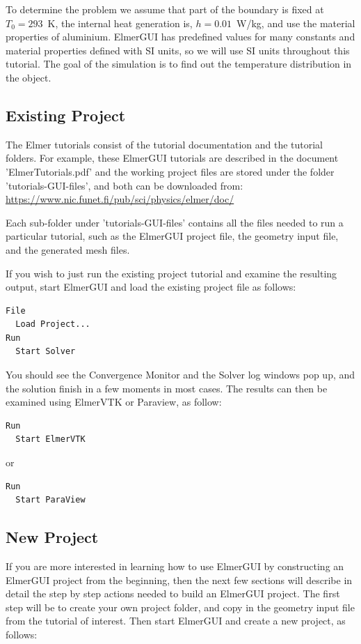 To determine the problem we assume that part of the boundary is fixed at $T_0=293$~K, the internal heat generation is, $h=0.01$~W/kg, and use the material properties of aluminium.  ElmerGUI has predefined values for many constants and material properties defined with SI units, so we will use SI units throughout this tutorial.  The goal of the simulation is to find out the temperature distribution in the object.


\subsection*{Existing Project}

The Elmer tutorials consist of the tutorial documentation and the tutorial folders.  For example, these ElmerGUI tutorials are described in the document 'ElmerTutorials.pdf' and the working project files are stored under the folder 'tutorials-GUI-files', and both can be downloaded from:  \url{https://www.nic.funet.fi/pub/sci/physics/elmer/doc/}

Each sub-folder under 'tutorials-GUI-files' contains all the files needed to run a particular tutorial, such as the ElmerGUI project file, the geometry input file, and the generated mesh files.  

If you wish to just run the existing project tutorial and examine the resulting output, start ElmerGUI and load the existing project file as follows:

\begin{verbatim}
File
  Load Project...
Run
  Start Solver
\end{verbatim}

You should see the Convergence Monitor and the Solver log windows pop up, and the solution finish in a few moments in most cases.  The results can then be examined using ElmerVTK or Paraview, as follow:

\begin{verbatim}
Run
  Start ElmerVTK
\end{verbatim}
or
\begin{verbatim}
Run
  Start ParaView
\end{verbatim}

\subsection*{New Project}

If you are more interested in learning how to use ElmerGUI by constructing an ElmerGUI project from the beginning, then the next few sections will describe in detail the step by step actions needed to build an ElmerGUI project.  The first step will be to create your own project folder, and copy in the geometry input file from the tutorial of interest.  Then start ElmerGUI and create a new project, as follows:


